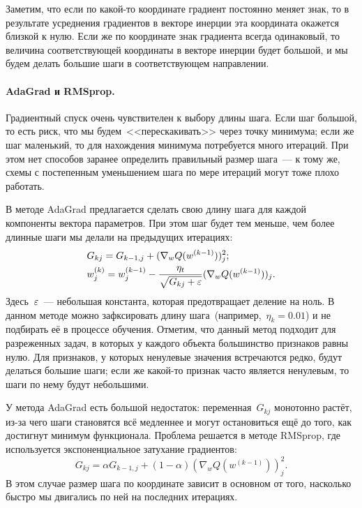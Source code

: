 \documentclass[12pt,fleqn]{article}
\begin{document}
Заметим, что если по какой-то координате градиент постоянно меняет знак, то в результате усреднения
градиентов в векторе инерции эта координата окажется близкой к нулю.
Если же по координате знак градиента всегда одинаковый, то величина соответствующей координаты
в векторе инерции будет большой, и мы будем делать большие шаги в соответствующем направлении.

\paragraph{AdaGrad и RMSprop.}
Градиентный спуск очень чувствителен к выбору длины шага.
Если шаг большой, то есть риск, что мы будем~<<перескакивать>> через точку минимума;
если же шаг маленький, то для нахождения минимума потребуется много итераций.
При этом нет способов заранее определить правильный размер шага~--- к тому же,
схемы с постепенным уменьшением шага по мере итераций могут тоже плохо работать.

В методе AdaGrad предлагается сделать свою длину шага для каждой компоненты вектора параметров.
При этом шаг будет тем меньше, чем более длинные шаги мы делали на предыдущих итерациях:
\begin{align*}
    &G_{kj} = G_{k-1,j} + (\nabla_w Q(w^{(k-1)}))_j^2;\\
    &w_j^{(k)} = w_j^{(k-1)} - \frac{\eta_t}{\sqrt{G_{kj} + \varepsilon}} (\nabla_w Q(w^{(k-1)}))_j.
\end{align*}
Здесь~$\varepsilon$~--- небольшая константа, которая предотвращает деление на ноль.
В данном методе можно зафксировать длину шага~(например,~$\eta_k = 0.01$)
и не подбирать её в процессе обучения.
Отметим, что данный метод подходит для разреженных задач, в которых у каждого объекта большинство признаков равны нулю.
Для признаков, у которых ненулевые значения встречаются редко, будут делаться большие шаги;
если же какой-то признак часто является ненулевым, то шаги по нему будут небольшими.

У метода AdaGrad есть большой недостаток: переменная~$G_{kj}$ монотонно растёт,
из-за чего шаги становятся всё медленнее и могут остановиться ещё до того,
как достигнут минимум функционала.
Проблема решается в методе RMSprop, где используется экспоненциальное затухание градиентов:
\[
    G_{kj} = \alpha G_{k-1,j} + (1 - \alpha) (\nabla_w Q(w^{(k-1)}))_j^2.
\]
В этом случае размер шага по координате зависит в основном от того, насколько
быстро мы двигались по ней на последних итерациях.
\end{document}

